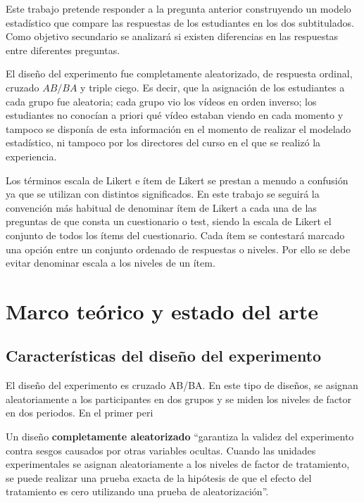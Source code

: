 \documentclass[
  12pt,
  a4paper,
  extrafontsizes,
  onecolumn,
  openright,
  table]{memoir}
\begin{document}
Este trabajo pretende responder a la pregunta anterior construyendo un
modelo estadístico que compare las respuestas de los estudiantes en los
dos subtitulados. Como objetivo secundario se analizará si existen
diferencias en las respuestas entre diferentes preguntas.

El diseño del experimento fue completamente aleatorizado, de respuesta
ordinal, cruzado \(AB/BA\) y triple ciego. Es decir, que la asignación
de los estudiantes a cada grupo fue aleatoria; cada grupo vio los vídeos
en orden inverso; los estudiantes no conocían a priori qué vídeo estaban
viendo en cada momento y tampoco se disponía de esta información en el
momento de realizar el modelado estadístico, ni tampoco por los
directores del curso en el que se realizó la experiencia.

Los términos escala de Likert e ítem de Likert se prestan a menudo a
confusión ya que se utilizan con distintos significados. En este trabajo
se seguirá la convención más habitual \autocite[ver][]{uebersax2006} de
denominar ítem de Likert a cada una de las preguntas de que consta un
cuestionario o test, siendo la escala de Likert el conjunto de todos los
ítems del cuestionario. Cada ítem se contestará marcado una opción entre
un conjunto ordenado de respuestas o niveles. Por ello se debe evitar
denominar escala a los niveles de un ítem.


\hypertarget{sec-arte}{%
\chapter{Marco teórico y estado del arte}\label{sec-arte}}

\hypertarget{caracteruxedsticas-del-diseuxf1o-del-experimento}{%
\section{Características del diseño del
experimento}\label{caracteruxedsticas-del-diseuxf1o-del-experimento}}

El diseño del experimento es cruzado AB/BA. En este tipo de diseños, se
asignan aleatoriamente a los participantes en dos grupos y se miden los
niveles de factor en dos periodos. En el primer peri

Un diseño \textbf{completamente aleatorizado}
\autocite[pp.~18]{lawson2015} \enquote{garantiza la validez del
experimento contra sesgos causados por otras variables ocultas. Cuando
las unidades experimentales se asignan aleatoriamente a los niveles de
factor de tratamiento, se puede realizar una prueba exacta de la
hipótesis de que el efecto del tratamiento es cero utilizando una prueba
de aleatorización}.
\end{document}
